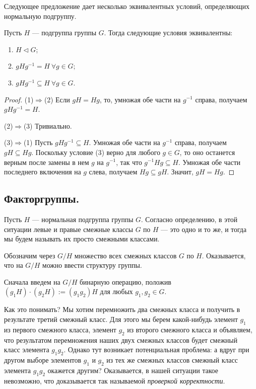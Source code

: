 Следующее предложение дает несколько эквивалентных условий,
определяющих нормальную подгруппу.

\begin{proposal}
    Пусть $H$ --- подгруппа группы $G$. Тогда следующие условия эквивалентны:
    \vspace{-0.2cm}
    \begin{enumerate}[label=(\arabic*)]
        \item $H \triangleleft G$;
        \item $gHg^{-1} = H \ \forall g \in G$;
        \item $gHg^{-1} \subseteq H \ \forall g \in G$.
    \end{enumerate}
\end{proposal}

\begin{proof}
    (1)$\Rightarrow$(2) Если $gH = Hg$, то, умножая обе части на $g^{-1}$ справа,
    получаем $gHg^{-1} = H$.

    (2)$\Rightarrow$(3) Тривиально.

    (3)$\Rightarrow$(1) Пусть $gHg^{-1} \subseteq H$.
    Умножая обе части на $g^{-1}$ справа, получаем $gH \subseteq Hg$.
    Поскольку условие (3) верно для любого $g \in G$, то оно останется
    верным после замены в нем $g$ на $g^{-1}$, так что $g^{-1}Hg \subseteq H$.
    Умножая обе части последнего включения на $g$ слева, получаем 
    $Hg \subseteq gH$. Значит, $gH = Hg$.
\end{proof}

\subsection{Факторгруппы.}

Пусть $H$ --- нормальная подгруппа группы $G$. Согласно определению,
в этой ситуации левые и правые смежные классы $G$ по $H$ --- это одно и то же,
и тогда мы будем называть их просто смежными классами.

Обозначим через $G / H$ множество всех смежных классов $G$ по $H$.
Оказывается, что на $G / H$ можно ввести структуру группы.

Сначала введем на $G / H$ бинарную операцию, положив $(g_1H) \cdot (g_2H) := (g_1g_2)H$
для любых $g_1, g_2 \in G$.

Как это понимать? Мы хотим перемножить два смежных класса и 
получить в результате третий смежный класс. Для этого мы берем
какой-нибудь элемент $g_1$ из первого смежного класса,
элемент $g_2$ из второго смежного класса и объявляем,
что результатом перемножения наших двух смежных классов
будет смежный класс элемента $g_1g_2$. 
Однако тут возникает потенциальная проблема:
а вдруг при другом выборе элементов $g_1$ и $g_2$ из тех же смежных классов
смежный класс элемента $g_1g_2$ окажется другим?
Оказывается, в нашей ситуации такое невозможно, 
что доказывается так называемой \textit{проверкой корректности}.

